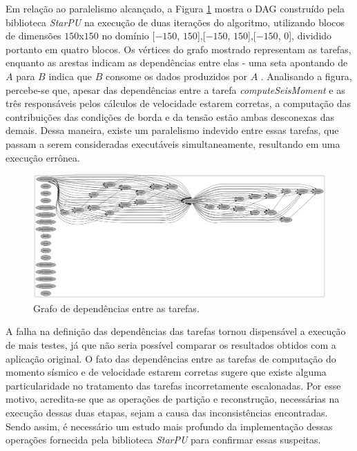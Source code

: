 \documentclass[cic,tc]{iiufrgs}
\begin{document}
Em relação ao paralelismo alcançado, a Figura \ref{fig:dag} mostra o DAG construído pela biblioteca \textit{StarPU} na execução de duas iterações do algoritmo, utilizando
blocos de dimensões $150$x$150$ no domínio [$-150$, $150$],[$-150$, $150$],[$-150$, $0$], dividido portanto em quatro blocos. Os vértices do grafo mostrado representam as tarefas,
enquanto as arestas indicam as dependências entre elas - uma seta apontando de $A$ para $B$ indica que $B$ consome os dados produzidos por $A$ . Analisando a figura, percebe-se que, apesar das dependências entre a tarefa \textit{computeSeisMoment} e as três responsáveis
pelos cálculos de velocidade estarem corretas, a computação das contribuições das condições de borda e da tensão estão ambas desconexas das demais. Dessa maneira, existe um paralelismo
indevido entre essas tarefas, que passam a serem consideradas executáveis simultaneamente, resultando em uma execução errônea.

\begin{figure}[!htb]
  \caption{Grafo de dependências entre as tarefas.}
    \begin{center} 
      \includegraphics[width=36em]{2it}
    \end{center}
    \label{fig:dag}
\end{figure}

A falha na definição das dependências das tarefas tornou dispensável a execução de mais testes, já que não seria possível comparar os resultados obtidos com a aplicação original. O fato
das dependências entre as tarefas de computação do momento sísmico e de velocidade estarem corretas sugere que existe alguma particularidade no tratamento das tarefas incorretamente
escalonadas. Por esse motivo, acredita-se que as operações de partição e reconstrução, necessárias na execução dessas duas etapas, sejam a causa das inconsistências encontradas. Sendo assim,
é necessário um estudo mais profundo da implementação dessas operações fornecida pela biblioteca \textit{StarPU} para confirmar essas suspeitas.
\end{document}

